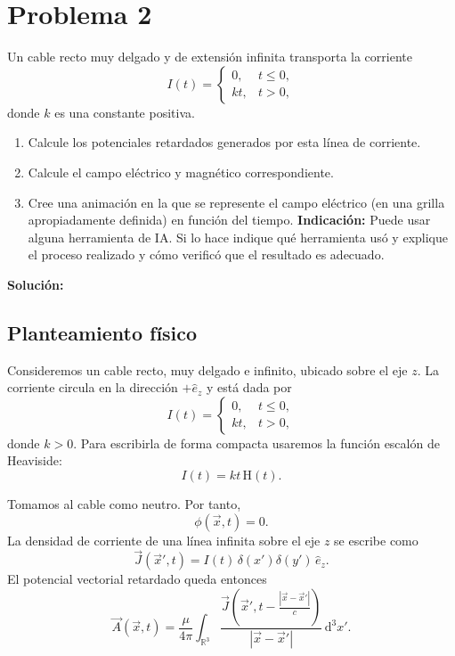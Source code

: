 \documentclass{article}
\numberwithin{equation}{section}
\newcommand{\dd}{\,\mathrm{d}}
\newcommand{\Hh}{\mathrm H}
\begin{document}
\newpage
\section{Problema 2}
Un cable recto muy delgado y de extensión infinita transporta la corriente
\begin{equation*}
I(t)=\begin{cases}
0,&t\le 0,\\
kt,&t>0,
\end{cases}
\end{equation*}
donde $k$ es una constante positiva.
\begin{enumerate}[label=(\alph*)]
\item Calcule los potenciales retardados generados por esta línea de corriente.
\item Calcule el campo eléctrico y magnético correspondiente.
\item Cree una animación en la que se represente el campo eléctrico (en una grilla apropiadamente definida) en función del tiempo. \textbf{Indicación:} Puede usar alguna herramienta de IA. Si lo hace indique qué herramienta usó y explique el proceso realizado y cómo verificó que el resultado es adecuado.
\end{enumerate}

\textbf{Solución:}
\subsection{Planteamiento físico}

Consideremos un cable recto, muy delgado e infinito, ubicado sobre el eje $z$. La corriente circula en la dirección $+\hat e_z$ y está dada por
\begin{equation*}
    I(t)=
    \begin{cases}
        0, & t\leq 0,\\
        kt, & t>0,
    \end{cases}
\end{equation*}
donde $k>0$. Para escribirla de forma compacta usaremos la función escalón de Heaviside:
\begin{equation*}
    I(t)=kt\,\Hh(t).
\end{equation*}

Tomamos al cable como neutro. Por tanto,
\begin{equation*}
    \phi(\vec x,t)=0.
\end{equation*}
La densidad de corriente de una línea infinita sobre el eje $z$ se escribe como
\begin{equation*}
    \vec J(\vec x',t)=I(t)\,\delta(x')\delta(y')\,\hat e_z.
\end{equation*}
El potencial vectorial retardado queda entonces
\begin{equation*}
    \vec A(\vec x,t)
    =\frac{\mu}{4\pi}\int_{\mathbb R^3}
    \frac{\vec J\left(\vec x',t-\frac{|\vec x-\vec x'|}{c}\right)}{|\vec x-\vec x'|}\dd^3x'.
\end{equation*}
\end{document}
